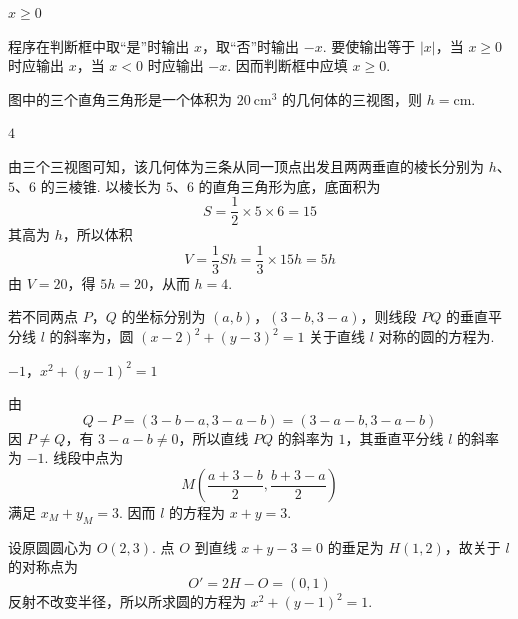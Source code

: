 \begin{answer}
\(x\geqslant 0\)
\end{answer}

\begin{solution}
程序在判断框中取“是”时输出 \(x\)，取“否”时输出 \(-x\). 要使输出等于 \(|x|\)，当 \(x\geqslant0\) 时应输出 \(x\)，当 \(x<0\) 时应输出 \(-x\). 因而判断框中应填 \(x\geqslant0\).
\end{solution}

\begin{problem}
图中的三个直角三角形是一个体积为 \(20 \mathrm{~cm}^{3}\) 的几何体的三视图，则 \(h=\)\fillinblank{}\(\mathrm{cm}\).

\end{problem}

\begin{answer}
\(4\)
\end{answer}

\begin{solution}
由三个三视图可知，该几何体为三条从同一顶点出发且两两垂直的棱长分别为 \(h\)、\(5\)、\(6\) 的三棱锥. 以棱长为 \(5\)、\(6\) 的直角三角形为底，底面积为
\[
S=\frac12\times5\times6=15
\]
其高为 \(h\)，所以体积
\[
V=\frac13Sh=\frac13\times15h=5h
\]
由 \(V=20\)，得 \(5h=20\)，从而 \(h=4\).
\end{solution}

\begin{problem}
若不同两点 \(P\)，\(Q\) 的坐标分别为 \((a, b)\)，\((3 - b, 3 - a)\)，则线段 \(PQ\) 的垂直平分线 \(l\) 的斜率为\fillinblank{}，圆 \((x - 2)^2 + (y - 3)^2 = 1\) 关于直线 \(l\) 对称的圆的方程为\fillinblank{}.
\end{problem}

\begin{answer}
\(-1\)，\(x^2 + (y - 1)^2 = 1\)
\end{answer}

\begin{solution}
由
\[
Q-P=(3-b-a,3-a-b)=(3-a-b,3-a-b)
\]
因 \(P\ne Q\)，有 \(3-a-b\ne0\)，所以直线 \(PQ\) 的斜率为 \(1\)，其垂直平分线 \(l\) 的斜率为 \(-1\). 线段中点为
\[
M\left(\frac{a+3-b}{2},\frac{b+3-a}{2}\right)
\]
满足 \(x_M+y_M=3\). 因而 \(l\) 的方程为 \(x+y=3\).

设原圆圆心为 \(O(2,3)\). 点 \(O\) 到直线 \(x+y-3=0\) 的垂足为 \(H(1,2)\)，故关于 \(l\) 的对称点为
\[
O'=2H-O=(0,1)
\]
反射不改变半径，所以所求圆的方程为 \(x^2+(y-1)^2=1\).
\end{solution}

